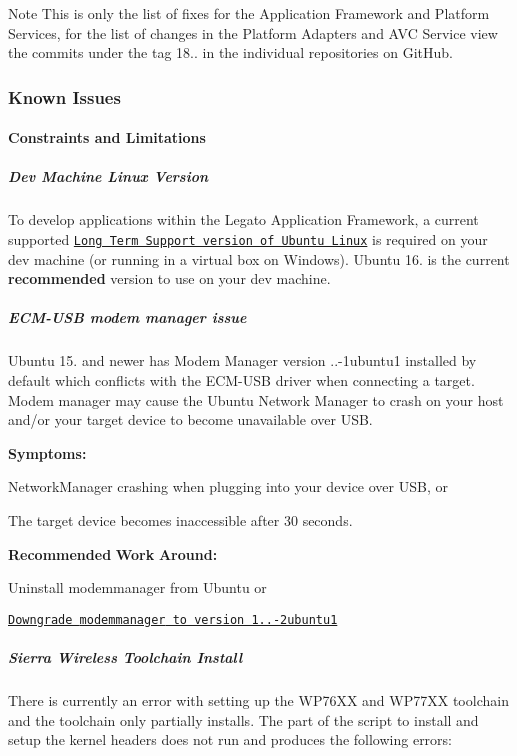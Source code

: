 \begin{DoxyNote}{Note}
This is only the list of fixes for the Application Framework and Platform Services, for the list of changes in the Platform Adapters and A\+VC Service view the commits under the tag 18.. in the individual repositories on Git\+Hub.
\end{DoxyNote}
\hypertarget{releaseNotes18051_rn1805_KnownIssues}{}\subsubsection{Known Issues}\label{releaseNotes18051_rn1805_KnownIssues}
\hypertarget{releaseNotes18051_rn1805_Constraints}{}\paragraph{Constraints and Limitations}\label{releaseNotes18051_rn1805_Constraints}
\hypertarget{releaseNotes18051_rn1805_ConstraintsLinuxSupport}{}\subparagraph{Dev Machine Linux Version}\label{releaseNotes18051_rn1805_ConstraintsLinuxSupport}
To develop applications within the Legato Application Framework, a current supported \href{https://www.ubuntu.com/info/release-end-of-life}{\tt Long Term Support version of Ubuntu Linux} is required on your dev machine (or running in a virtual box on Windows). Ubuntu 16. is the current {\bfseries recommended} version to use on your dev machine.\hypertarget{releaseNotes18051_rn1805_ConstECMUSB}{}\subparagraph{E\+C\+M-\/\+U\+S\+B modem manager issue}\label{releaseNotes18051_rn1805_ConstECMUSB}
Ubuntu 15. and newer has Modem Manager version {..-\/1ubuntu1} installed by default which conflicts with the E\+C\+M-\/\+U\+SB driver when connecting a target. Modem manager may cause the Ubuntu Network Manager to crash on your host and/or your target device to become unavailable over U\+SB.

{\bfseries Symptoms\+:} 
\begin{DoxyItemize}
\item Network\+Manager crashing when plugging into your device over U\+SB, or
\item The target device becomes inaccessible after 30 seconds.
\end{DoxyItemize}

{\bfseries Recommended} {\bfseries Work} {\bfseries Around\+:} 
\begin{DoxyItemize}
\item Uninstall {\ttfamily modemmanager} from Ubuntu or
\item \href{http://packages.ubuntu.com/trusty/modemmanager}{\tt Downgrade {\ttfamily modemmanager} to version 1..-\/2ubuntu1}
\end{DoxyItemize}\hypertarget{releaseNotes18051_rn1805_ConstraintsTC}{}\subparagraph{Sierra Wireless Toolchain Install}\label{releaseNotes18051_rn1805_ConstraintsTC}
There is currently an error with setting up the W\+P76\+XX and W\+P77\+XX toolchain and the toolchain only partially installs. The part of the script to install and setup the kernel headers does not run and produces the following errors\+:

